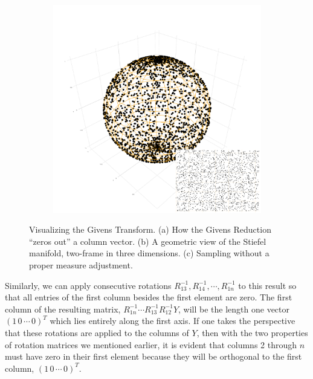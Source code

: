 \documentclass{article}
\begin{document}
\begin{figure}
\begin{subfigure}[b]{0.3\textwidth}
        \caption{}
        \label{fig:StiefelGeom}
    \end{subfigure}
    ~ %
    \begin{subfigure}[b]{0.3\textwidth}
        \includegraphics[width=\textwidth]{AreaForm.png}
        \caption{}
        \label{fig:AreaForm}
    \end{subfigure}
    \caption{Visualizing the Givens Transform. (a) How the Givens Reduction ``zeros out'' a column vector. (b) A geometric view of the Stiefel manifold, two-frame in three dimensions. (c) Sampling without a proper measure adjustment.}\label{fig:Givens}
\end{figure}

Similarly, we can apply consecutive rotations $R_{13}^{-1}, R_{14}^{-1}, \cdots, R_{1n}^{-1}$ to this result so that all entries of the first column besides the first element are zero. The first column of the resulting matrix, $R_{1n}^{-1} \cdots R_{13}^{-1}  R_{12}^{-1}Y$, will be the length one vector $(1 \, 0 \, \cdots \, 0)^T$ which lies entirely along the first axis. If one takes the perspective that these rotations are applied to the columns of $Y$, then with the two properties of rotation matrices we mentioned earlier, it is evident that columns 2 through $n$ must have zero in their first element because they will be orthogonal to the first column, $(1 \, 0 \, \cdots \, 0)^T$.
\end{document}

